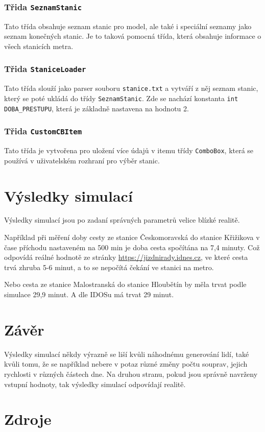 \documentclass[12pt, a4paper]{article}
\begin{document}
\subsubsection{Třida \texttt{SeznamStanic}}
Tato třída obsahuje seznam stanic pro model, ale také i speciální seznamy jako seznam konečných stanic. Je to taková pomocná třída, která obsahuje informace o všech stanicích metra.

\subsubsection{Třida \texttt{StaniceLoader}}
Tato třída slouží jako parser souboru \texttt{stanice.txt} a vytváří z něj seznam stanic, který se poté ukládá do třídy \texttt{SeznamStanic}. Zde se nachází konstanta \texttt{int DOBA\_PRESTUPU}, která je základně nastavena na hodnotu 2.

\subsubsection{Třida \texttt{CustomCBItem}}
Tato třída je vytvořena pro uložení více údajů v itemu třídy \texttt{ComboBox}, která se používá v uživatelském rozhraní pro výběr stanic.

\section{Výsledky simulací}
Výsledky simulací jsou po zadaní správných parametrů velice blízké realitě. 

Například při měření doby cesty ze stanice Českomoravská do stanice Křižikova v čase příchodu nastaveném na 500 min je doba cesta spočítána na 7,4 minuty. Což odpovídá reálné hodnotě ze stránky \url{https://jizdnirady.idnes.cz}, ve které cesta trvá zhruba 5-6 minut, a to se nepočítá čekání ve stanici na metro.

Nebo cesta ze stanice Malostranská do stanice Hloubětín by měla trvat podle simulace 29,9 minut. A dle IDOSu má trvat 29 minut.
\section{Závěr}
Výsledky simulací někdy výrazně se liší kvůli náhodnému generování lidí, také kvůli tomu, že se například nebere v potaz různé změny počtu souprav, jejich rychlosti v různých částech dne.
Na druhou stranu, pokud jsou správně navrženy vstupní hodnoty, tak výsledky simulací odpovídají realitě.\nocite{*}
\section{Zdroje}
\printbibliography[heading=none]
\end{document}
